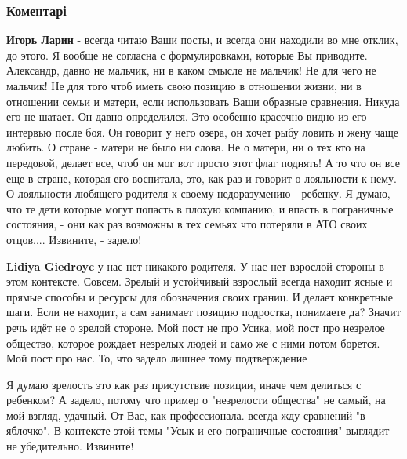  
 
 
 
 
\subsubsection{Коментарі}
\label{sec:26_09_2021.fb.larin_igor.psiholog.1.ukraina_usik_pobeda.cmt}

\begin{itemize} %
\textbf{Игорь Ларин} - всегда читаю Ваши посты, и всегда они находили во мне
отклик, до этого. Я вообще не согласна с формулировками, которые Вы приводите.
Александр, давно не мальчик, ни в каком смысле не мальчик! Не для чего не
мальчик! Не для того чтоб иметь свою позицию в отношении жизни, ни в отношении
семьи и матери, если использовать Ваши образные сравнения. Никуда его не
шатает. Он давно определился. Это особенно красочно видно из его интервью после
боя. Он говорит у него озера, он хочет рыбу ловить и жену чаще любить. О стране
- матери не было ни слова. Не о матери, ни о тех кто на передовой, делает все,
чтоб он мог вот просто этот флаг поднять! А то что он все еще в стране, которая
его воспитала, это, как-раз и говорит о лояльности к нему. О лояльности
любящего родителя к своему недоразумению - ребенку. Я думаю, что те дети
которые могут попасть в плохую компанию, и впасть в пограничные состояния, -
они как раз возможны в тех семьях что потеряли в АТО своих отцов.... Извините,
- задело!

\begin{itemize} %
\textbf{Lidiya Giedroyc} у нас нет никакого родителя. У нас нет взрослой стороны в этом контексте. Совсем.
Зрелый и устойчивый взрослый всегда находит ясные и прямые способы и ресурсы для обозначения своих границ.
И делает конкретные шаги.
Если не находит, а сам занимает позицию подростка, понимаете да? Значит речь идёт не о зрелой стороне.
Мой пост не про Усика, мой пост про незрелое общество, которое рождает незрелых людей и само же с ними потом борется.
Мой пост про нас.
То, что задело лишнее тому подтверждение


Я думаю зрелость это как раз присутствие позиции, иначе чем делиться с
ребенком? А задело, потому что пример о "незрелости общества" не самый, на мой
взгляд, удачный. От Вас, как профессионала. всегда жду сравнений "в яблочко". В
контексте этой темы "Усык и его пограничные состояния" выглядит не убедительно.
Извините!


\end{itemize}
\end{itemize}
